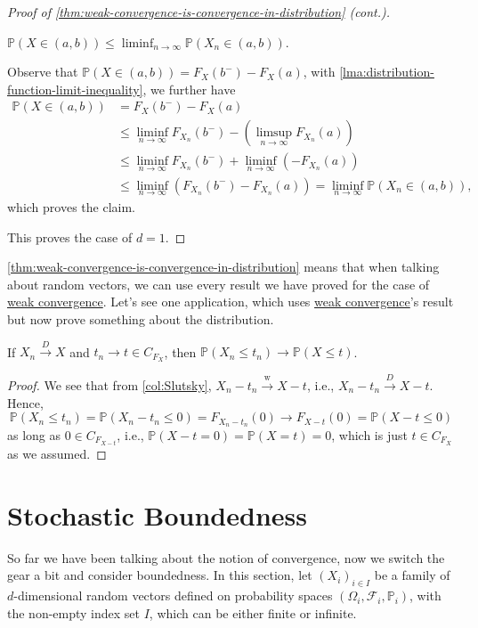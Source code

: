 \begin{proof}[Proof of \autoref{thm:weak-convergence-is-convergence-in-distribution} (cont.)]
	\begin{claim}
		\(\mathbb{P} (X \in (a, b)) \leq \liminf_{n \to \infty} \mathbb{P} (X_n \in (a, b))\).
	\end{claim}
	\begin{explanation}
		Observe that \(\mathbb{P} (X \in (a, b)) = F_X(b^-) - F_X(a)\), with \autoref{lma:distribution-function-limit-inequality}, we further have
		\[
			\begin{split}
				\mathbb{P} (X \in (a, b))
				 & = F_X(b^-) - F_X(a)                                                                         \\
				 & \leq \liminf_{n \to \infty} F_{X_n}(b^-) - \left( \limsup_{n \to \infty} F_{X_n}(a) \right) \\
				 & \leq \liminf_{n \to \infty} F_{X_n}(b^-) + \liminf_{n \to \infty} (-F_{X_n}(a))             \\
				 & \leq \liminf_{n \to \infty} \left( F_{X_n}(b^-) - F_{X_n}(a) \right)
				= \liminf_{n \to \infty} \mathbb{P} (X_n \in (a, b)),
			\end{split}
		\]
		which proves the claim.
	\end{explanation}
	This proves the case of \(d = 1\).
\end{proof}

\autoref{thm:weak-convergence-is-convergence-in-distribution} means that when talking about random vectors, we can use every result we have proved for the case of \hyperref[def:converge-weakly]{weak convergence}. Let's see one application, which uses \hyperref[def:converge-weakly]{weak convergence}'s result but now prove something about the distribution.

\begin{proposition}
	If \(X_n \overset{D}{\to } X\) and \(t_n \to t \in C_{F_X}\), then \(\mathbb{P} (X_n \leq t_n) \to \mathbb{P} (X \leq t)\).
\end{proposition}
\begin{proof}
	We see that from \autoref{col:Slutsky}, \(X_n - t_n \overset{\text{w} }{\to } X - t\), i.e., \(X_n - t_n \overset{D}{\to } X - t\). Hence,
	\[
		\mathbb{P} (X_n \leq t_n)
		= \mathbb{P} (X_n - t_n \leq 0)
		= F_{X_n - t_n} (0)
		\to F_{X - t} (0)
		= \mathbb{P} (X - t \leq 0)
	\]
	as long as \(0 \in C_{F_{X - t}}\), i.e., \(\mathbb{P} (X - t = 0) = \mathbb{P} (X = t) = 0\), which is just \(t \in C_{F_X}\) as we assumed.
\end{proof}

\section{Stochastic Boundedness}
So far we have been talking about the notion of convergence, now we switch the gear a bit and consider boundedness. In this section, let \((X_i)_{i \in I}\) be a family of \(d\)-dimensional random vectors defined on probability spaces \((\Omega _i, \mathscr{F} _i, \mathbb{P} _i)\), with the non-empty index set \(I\), which can be either finite or infinite.

